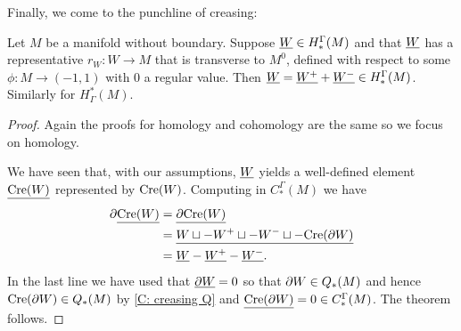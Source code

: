Finally, we come to the punchline of creasing:

\begin{theorem}\label{T: cohomology creasing}
Let $M$ be a manifold without boundary. Suppose $\underline{W} \in H_*^\Gamma(M)$ and that $\underline{W}$ has a representative $r_W \colon W \to M$ that is transverse to $M^0$, defined with respect to some $\phi \colon M \to (-1,1)$ with $0$ a regular value.
Then $\underline{W} = \underline{W^+}+\underline{W^-} \in H_*^\Gamma(M)$. Similarly for $H^*_\Gamma(M)$.
\end{theorem}
\begin{proof}
Again the proofs for homology and cohomology are the same so we focus on homology.

We have seen that, with our assumptions, $\underline{W}$ yields a well-defined element $\underline{\mathrm{Cre}(W)}$ represented by $\mathrm{Cre}(W)$. Computing in $C_*^\Gamma(M)$ we have
\begin{align*}
\partial \underline{\mathrm{Cre}(W)}& = \underline{\partial \mathrm{Cre}(W) }\\
& = \underline{W \sqcup -W^+ \sqcup -W^- \sqcup -\mathrm{Cre}(\partial W)}\\
& = \underline{W} -\underline{W^+}-\underline{W^-}.
\end{align*}
In the last line we have used that $\underline{\partial W} = 0$ so that $\partial W \in Q_*(M)$ and hence $\mathrm{Cre}(\partial W) \in Q_*(M)$ by \cref{C: creasing Q} and $\underline{\mathrm{Cre}(\partial W)} = 0 \in C_*^\Gamma(M)$.
The theorem follows.
\end{proof}

